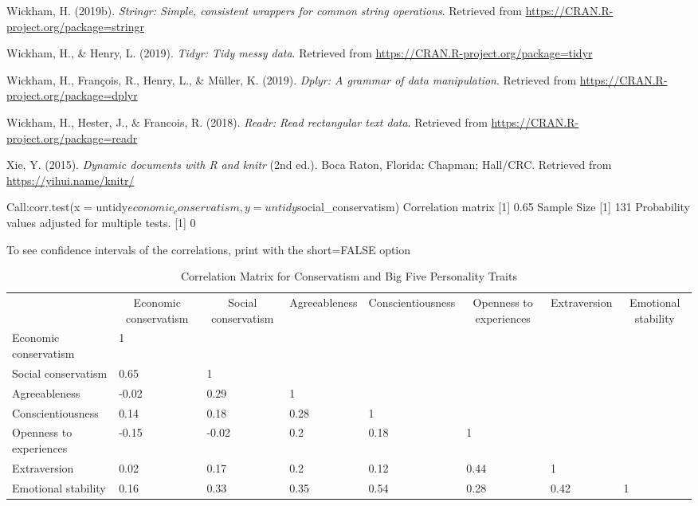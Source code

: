 \documentclass[man]{apa6}
\makeatletter
\newenvironment{lltable}{\begin{landscape}\begin{center}\begin{ThreePartTable}}{\end{ThreePartTable}\end{center}\end{landscape}}
\newcommand\LastLTentrywidth{1em}
\newlength\longtablewidth
\newcommand{\getlongtablewidth}{\begingroup \ifcsname LT@\roman{LT@tables}\endcsname \global\longtablewidth=0pt \renewcommand{\LT@entry}[2]{\global\advance\longtablewidth by ##2\relax\gdef\LastLTentrywidth{##2}}\@nameuse{LT@\roman{LT@tables}} \fi \endgroup}
\makeatother
\begin{document}
\hypertarget{ref-R-stringr}{}
Wickham, H. (2019b). \emph{Stringr: Simple, consistent wrappers for
common string operations}. Retrieved from
\url{https://CRAN.R-project.org/package=stringr}

\hypertarget{ref-R-tidyr}{}
Wickham, H., \& Henry, L. (2019). \emph{Tidyr: Tidy messy data}.
Retrieved from \url{https://CRAN.R-project.org/package=tidyr}

\hypertarget{ref-R-dplyr}{}
Wickham, H., François, R., Henry, L., \& Müller, K. (2019). \emph{Dplyr:
A grammar of data manipulation}. Retrieved from
\url{https://CRAN.R-project.org/package=dplyr}

\hypertarget{ref-R-readr}{}
Wickham, H., Hester, J., \& Francois, R. (2018). \emph{Readr: Read
rectangular text data}. Retrieved from
\url{https://CRAN.R-project.org/package=readr}

\hypertarget{ref-R-knitr}{}
Xie, Y. (2015). \emph{Dynamic documents with R and knitr} (2nd ed.).
Boca Raton, Florida: Chapman; Hall/CRC. Retrieved from
\url{https://yihui.name/knitr/}

Call:corr.test(x =
untidy\(economic_conservatism, y = untidy\)social\_conservatism)
Correlation matrix {[}1{]} 0.65 Sample Size {[}1{]} 131 Probability
values adjusted for multiple tests. {[}1{]} 0

To see confidence intervals of the correlations, print with the
short=FALSE option

\begin{lltable}


\tiny{
\begin{longtable}{llllllll}\noalign{\getlongtablewidth\global\LTcapwidth=\longtablewidth}
\caption{\label{tab:correlations}Correlation Matrix for Conservatism and Big Five Personality Traits}\\
\toprule
 & \multicolumn{1}{c}{Economic conservatism} & \multicolumn{1}{c}{Social conservatism} & \multicolumn{1}{c}{Agreeableness} & \multicolumn{1}{c}{Conscientiousness} & \multicolumn{1}{c}{Openness to experiences} & \multicolumn{1}{c}{Extraversion} & \multicolumn{1}{c}{Emotional stability}\\
\midrule
Economic conservatism & 1 &  &  &  &  &  & \\
Social conservatism & 0.65 & 1 &  &  &  &  & \\
Agreeableness & -0.02 & 0.29 & 1 &  &  &  & \\
Conscientiousness & 0.14 & 0.18 & 0.28 & 1 &  &  & \\
Openness to experiences & -0.15 & -0.02 & 0.2 & 0.18 & 1 &  & \\
Extraversion & 0.02 & 0.17 & 0.2 & 0.12 & 0.44 & 1 & \\
Emotional stability & 0.16 & 0.33 & 0.35 & 0.54 & 0.28 & 0.42 & 1\\
\bottomrule
\end{longtable}
}
\end{lltable}
\end{document}
